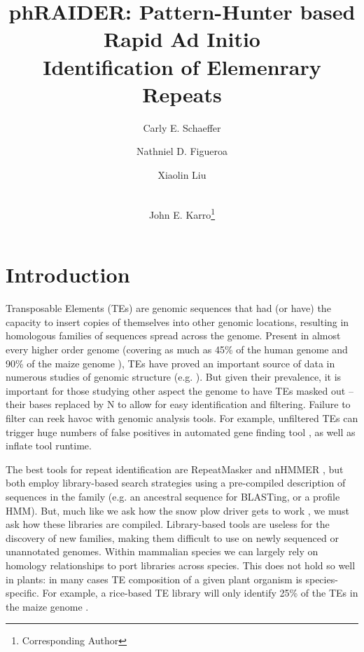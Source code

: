 \documentclass[11pt,letterpaper]{amsart}
\title{phRAIDER: Pattern-Hunter based Rapid Ad Initio \\ Identification of Elemenrary Repeats}
\author[1]{Carly E. Schaeffer}
\author[1]{Nathniel D. Figueroa}
\author[2]{Xiaolin Liu}
\author[1,2,3,4]{\\John E. Karro\thanks{Corresponding Author}}
\affil[1]{Department of Computer Science and Software Engineering}
\affil[2]{Cell, Molecular, and Structural Bology}
\affil[3]{Department of Microbiology}
\affil[4]{Department of Statisticcs, Miami University, Oxford, Ohio (USA)}
\date{}
\begin{document}
\maketitle
{}

\section*{Introduction}

Transposable Elements (TEs) are genomic sequences that had (or have) the capacity
to insert copies of themselves into other genomic locations, resulting
in homologous families of sequences spread across the genome.  Present
in almost every higher order genome (covering as much as 45\% of the
human genome and 90\% of the maize genome
\cite{Venter:2001p92,SanMiguel:1996wa}), TEs have proved an important
source of data in numerous studies of genomic structure (e.g.
\cite{Arndt:2005p279,Karro:2008p123,Mugal:2009p581,Hardison:2003p97}).
But given their prevalence, it is important for those studying other
aspect the genome to have TEs masked out -- their bases replaced by N
to allow for easy identification and filtering.  Failure to filter can
reek havoc with genomic analysis tools.  For example, unfiltered TEs can trigger
huge numbers of false positives in automated gene finding tool
\cite{Jiang:2013jt}, as well as inflate tool runtime.

The best tools for repeat identification are RepeatMasker and nHMMER
\cite{RepeatMaskerOpen:XkNxXSd7,Wheeler:2013gj}, but both employ
library-based search strategies using a pre-compiled description of
sequences in the family (e.g. an ancestral sequence for BLASTing, or a
profile HMM).  But, much like we ask how the snow plow driver gets to
work \cite{Pratchett:uw}, we must ask how these libraries are
compiled.  Library-based tools are useless for the discovery of new
families, making them difficult to use on newly sequenced or
unannotated genomes. Within mammalian species we can largely rely on
homology relationships to port libraries across species.  This does
not hold so well in plants: in many cases TE composition of a given
plant organism is species-specific.  For example, a rice-based TE
library will only identify 25\% of the TEs in the maize genome
\cite{Jiang:2013jt}.
\end{document}
